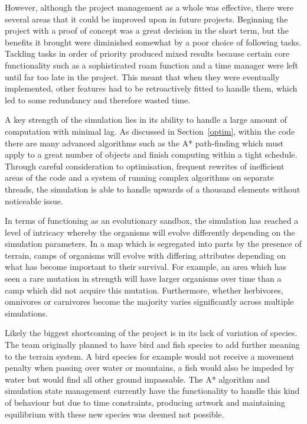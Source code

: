 \documentclass[a4paper, oneside, 11pt]{report}
\begin{document}
However, although the project management as a whole was effective, there were several areas that it could be improved upon in future projects. Beginning the project with a proof of concept was a great decision in the short term, but the benefits it brought were diminished somewhat by a poor choice of following tasks. Tackling tasks in order of priority produced mixed results because certain core functionality such as a sophisticated roam function and a time manager were left until far too late in the project. This meant that when they were eventually implemented, other features had to be retroactively fitted to handle them, which led to some redundancy and therefore wasted time.

A key strength of the simulation lies in its ability to handle a large amount of computation with minimal lag. As discussed in Section~\ref{optim}, within the code there are many advanced algorithms such as the A* path-finding which must apply to a great number of objects and finish computing within a tight schedule. Through careful consideration to optimisation, frequent rewrites of inefficient areas of the code and a system of running complex algorithms on separate threads, the simulation is able to handle upwards of a thousand elements without noticeable issue.

In terms of functioning as an evolutionary sandbox, the simulation has reached a level of intricacy whereby the organisms will evolve differently depending on the simulation parameters. In a map which is segregated into parts by the presence of terrain, camps of organisms will evolve with differing attributes depending on what has become important to their survival. For example, an area which has seen a rare mutation in strength will have larger organisms over time than a camp which did not acquire this mutation. Furthermore, whether herbivores, omnivores or carnivores become the majority varies significantly across multiple simulations.

Likely the biggest shortcoming of the project is in its lack of variation of species. The team originally planned to have bird and fish species to add further meaning to the terrain system. A bird species for example would not receive a movement penalty when passing over water or mountains, a fish would also be impeded by water but would find all other ground impassable. The A* algorithm and simulation state management currently have the functionality to handle this kind of behaviour but due to time constraints, producing artwork and maintaining equilibrium with these new species was deemed not possible.
\end{document}
